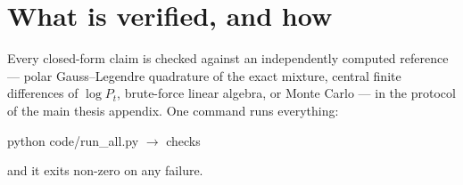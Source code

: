 \documentclass[11pt]{article}
\theoremstyle{plain}
\theoremstyle{remark}
\begin{document}
\section{What is verified, and how}\label{sec:audit}

Every closed-form claim is checked against an independently computed reference
--- polar Gauss--Legendre quadrature of the exact mixture, central finite
differences of $\log P_t$, brute-force linear algebra, or Monte Carlo --- in the
protocol of the main thesis appendix. One command runs everything:

\begin{center}\ttfamily
python code/run\_all.py \qquad $\longrightarrow$  checks
\end{center}

\noindent
and it exits non-zero on any failure.
\end{document}
